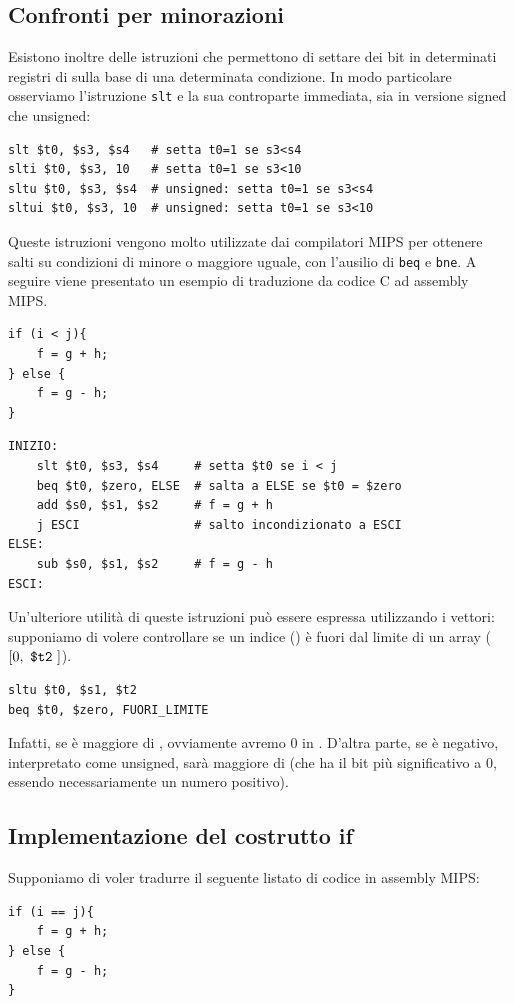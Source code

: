 \documentclass[class=book, crop=false, oneside]{standalone}
\begin{document}
\subsection*{Confronti per minorazioni}
Esistono inoltre delle istruzioni che permettono di settare dei bit in determinati registri di  sulla base di una determinata condizione. In modo particolare osserviamo l'istruzione \texttt{slt} e la sua controparte immediata, sia in versione signed che unsigned:
\begin{verbatim}
slt $t0, $s3, $s4   # setta t0=1 se s3<s4
slti $t0, $s3, 10   # setta t0=1 se s3<10
sltu $t0, $s3, $s4  # unsigned: setta t0=1 se s3<s4
sltui $t0, $s3, 10  # unsigned: setta t0=1 se s3<10
\end{verbatim}
Queste istruzioni vengono molto utilizzate dai compilatori MIPS per ottenere salti su condizioni di minore o maggiore uguale, con l'ausilio di \texttt{beq} e \texttt{bne}. A seguire viene presentato un esempio di traduzione da codice C ad assembly MIPS.
\begin{verbatim}
if (i < j){
	f = g + h;
} else {
	f = g - h;
}
\end{verbatim}
\begin{verbatim}
INIZIO:
	slt $t0, $s3, $s4     # setta $t0 se i < j
	beq $t0, $zero, ELSE  # salta a ELSE se $t0 = $zero
	add $s0, $s1, $s2     # f = g + h
	j ESCI                # salto incondizionato a ESCI
ELSE:
	sub $s0, $s1, $s2     # f = g - h
ESCI:
\end{verbatim}
Un'ulteriore utilità di queste istruzioni può essere espressa utilizzando i vettori: supponiamo di volere controllare se un indice () è fuori dal limite di un array (\([0, \text{ \texttt{\$t2} }]\)).
\begin{verbatim}
sltu $t0, $s1, $t2
beq $t0, $zero, FUORI_LIMITE
\end{verbatim}
Infatti, se  è maggiore di , ovviamente avremo 0 in . D'altra parte, se  è negativo, interpretato come unsigned, sarà maggiore di  (che ha il bit più significativo a 0, essendo  necessariamente un numero positivo).

\subsection*{Implementazione del costrutto if}
Supponiamo di voler tradurre il seguente listato di codice in assembly MIPS:
\begin{verbatim}
if (i == j){
	f = g + h;
} else {
	f = g - h;
}
\end{verbatim}
\end{document}
